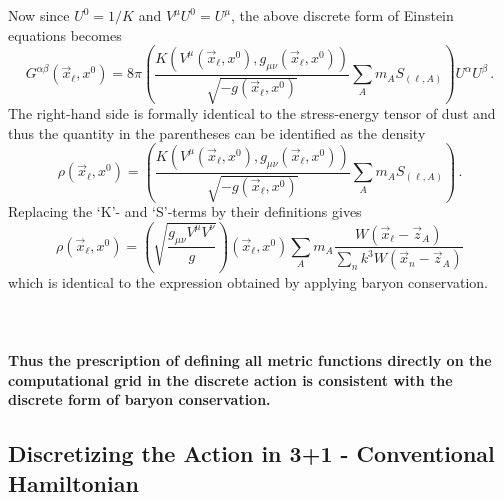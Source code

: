 Now since $U^0 = 1/K$ and $V^{\mu} U^0 = U^{\mu}$, the above discrete 
form of Einstein equations becomes
\[
  G^{\alpha\beta}({\vec x}_{\ell},x^0) = 8 \pi 
                                         \left(
										 \frac{K(V^{\mu}(\vec x_{\ell},x^0),
										             g_{\mu\nu}(\vec x_{\ell},x^0))
											  }
                 					          {                                           										 
                							    \sqrt{-g({\vec x}_{\ell},x^0)} 
											  }
										 \sum _A m_A S_{(\ell,A)}								 
										 \right)
										 U^{\alpha} U^{\beta} \, .
\]
The right-hand side is formally identical to the stress-energy tensor of 
dust and thus the quantity in the parentheses can be identified as the density
\[
  \rho(\vec x_{\ell},x^0) = \left(
							       \frac{K(V^{\mu}(\vec x_{\ell},x^0),
							        g_{\mu\nu}(\vec x_{\ell},x^0))
								  }
                 			      {                                           										 
                				    \sqrt{-g({\vec x}_{\ell},x^0)} 
								  }
							 \sum _A m_A S_{(\ell,A)}								 
							\right) \, .
\]
Replacing the `K'- and `S'-terms by their definitions gives
\[
  \rho(\vec x_{\ell},x^0) = \left( 
                              \sqrt{
                                 \frac{g_{\mu\nu} V^{\mu} V^{\nu}}
								      {g}
								   }
						    \right)(\vec x_{\ell},x^0)
							\sum _A m_A 
							\frac{ W({\vec x}_{\ell} - {\vec z_A})}
                                 {\sum _n k^3 W({\vec x}_{n} - {\vec z_A}) } 
\]
which is identical to the expression obtained by applying baryon 
conservation.  
\\
\\
\\
\\
\noindent
\textbf{Thus the prescription of defining all metric functions directly on the 
computational grid in the discrete action is consistent with the 
discrete form of baryon conservation.}

\newpage 


\subsection{Discretizing the Action in 3+1 - Conventional Hamiltonian}

